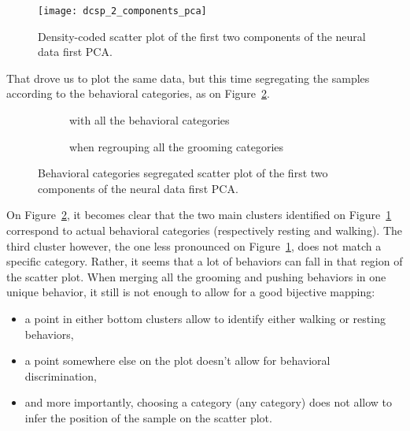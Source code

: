 \begin{figure}[htbp]
	\begin{center}
		\texttt{[image: dcsp\_2\_components\_pca]}
		\caption{Density-coded scatter plot of the first two components of the neural data first PCA.}
		\label{fig::neural_data_pca1_scatter}
	\end{center}
\end{figure}

That drove us to plot the same data, but this time segregating the samples according to the behavioral categories, as on Figure~\ref{fig::neural_data_pca1_scatter_classes}.

\begin{figure}[htbp]
	\begin{subfigure}{.52\textwidth}
		\begin{center}
			
			\caption{with all the behavioral categories}
		\end{center}
	\end{subfigure}
	\begin{subfigure}{.46\textwidth}
		\begin{center}
			
			\caption{when regrouping all the grooming categories}
		\end{center}
	\end{subfigure}
	\caption{Behavioral categories segregated scatter plot of the first two components of the neural data first PCA.}
	\label{fig::neural_data_pca1_scatter_classes}
\end{figure}

On Figure~\ref{fig::neural_data_pca1_scatter_classes}, it becomes clear that the two main clusters identified on Figure~\ref{fig::neural_data_pca1_scatter} correspond to actual behavioral categories (respectively resting and walking).
The third cluster however, the one less pronounced on Figure~\ref{fig::neural_data_pca1_scatter}, does not match a specific category.
Rather, it seems that a lot of behaviors can fall in that region of the scatter plot.
When merging all the grooming and pushing behaviors in one unique behavior, it still is not enough to allow for a good bijective mapping:

\begin{itemize}
	\item a point in either bottom clusters allow to identify either walking or resting behaviors,
	\item a point somewhere else on the plot doesn't allow for behavioral discrimination,
	\item and more importantly, choosing a category (any category) does not allow to infer the position of the sample on the scatter plot.
\end{itemize}

